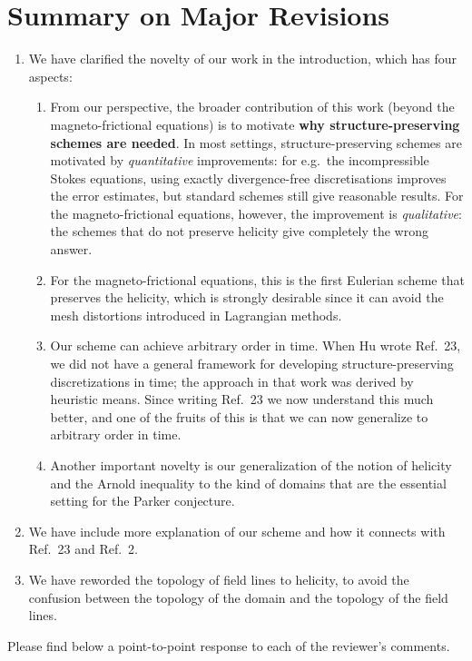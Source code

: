 \documentclass{article}
\theoremstyle{definition}
\begin{document}
\section{Summary on Major Revisions}
\begin{enumerate}
    \item We have clarified the novelty of our work in the introduction, which has four aspects:
    \begin{enumerate}
        \item From our perspective, the broader contribution of this work (beyond the magneto-frictional equations) is to motivate \textbf{why structure-preserving schemes are needed}. In most settings, structure-preserving schemes are motivated by \emph{quantitative} improvements: for e.g.~the incompressible Stokes equations, using exactly divergence-free discretisations improves the error estimates, but standard schemes still give reasonable results. For the magneto-frictional equations, however, the improvement is \emph{qualitative}: the schemes that do not preserve helicity give completely the wrong answer.
        \item For the magneto-frictional equations, this is the first Eulerian scheme that preserves the helicity,
which is strongly desirable since it can avoid the mesh distortions introduced in
Lagrangian methods.
    \item  Our scheme can achieve arbitrary order in time. When Hu wrote Ref.\ 23, we did not have a general framework for developing structure-preserving discretizations in time; the approach in that work was derived by heuristic means. Since writing Ref.\ 23 we now understand this much better, and one of the fruits of this is that we can now generalize to arbitrary order in time.
    \item  Another important novelty is our generalization of the notion of helicity and the Arnold inequality to the kind of domains that are the essential setting for the Parker conjecture.
    \end{enumerate}
    \item We have include more explanation of our scheme and how it connects with Ref.~23 and Ref.~2. 
    \item We have reworded the topology of field lines to helicity, to avoid the confusion between the topology of the domain and the topology of the field lines. 
\end{enumerate}

Please find below a point-to-point response to each of the reviewer's comments.
\end{document}
